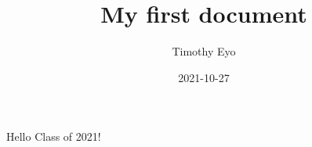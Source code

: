 \documentclass{article}
\title{My first document}
\date{2021-10-27}
\author{Timothy Eyo}
\begin{document}
	\maketitle
	\newpage
	Hello Class of 2021!
	
\end{document}
